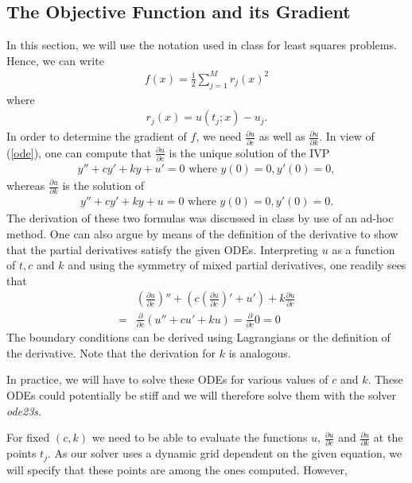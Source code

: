 \documentclass{article}
\begin{document}
\subsection{The Objective Function and its Gradient}
In this section, we will use the notation used in class for
least squares problems. Hence, we can write 
\begin{align*}
f(x)=\frac{1}{2}\sum_{j=1}^M r_j(x)^2
\end{align*}
where 
\begin{align*}
  r_j(x)= u(t_j;x)-u_j.
\end{align*}
In order to determine the gradient of $f$, we need $\frac{\partial u}{\partial c}$
as well as $\frac{\partial u}{\partial k}$. In view of (\ref{ode}), one can compute that
 $\frac{\partial u}{\partial c}$ is the unique  solution of the IVP 
\begin{align}
   y''+cy'+ky+u'=0 \textrm{ where } y(0)=0, y'(0)=0,
\label{odec}
\end{align}
whereas  $\frac{\partial u}{\partial k}$ is the solution of
\begin{align}
   y''+cy'+ky+u=0 \textrm{ where } y(0)=0, y'(0)=0.
\label{odek}
\end{align}
The derivation of these two formulas was discussed in class by use of an ad-hoc method. One can also argue by
means of the definition of the derivative to show that the partial derivatives satisfy the given ODEs. Interpreting $u$ as a function of $t,c$ and $k$ and
using the symmetry of mixed partial derivatives, one readily sees  that 
\begin{align*}
 &\left( \frac{\partial u}{\partial c}\right)''+\left(c \left(\frac{\partial u}{\partial c}\right)'+u' \right)+k \frac{\partial u}{\partial c} \\
= & \frac{\partial}{\partial c}\left(u''+cu'+ku  \right)=\frac{\partial}{\partial c} 0 =0
\end{align*}
 The boundary conditions can be derived using Lagrangians or the definition of the derivative. Note that the derivation for $k$ is analogous. \par
In practice, we will have to solve these ODEs for various values of $c$ and $k$. These ODEs could potentially be stiff and we will therefore solve them with the
solver \emph{ode23s}. \par
For fixed $(c,k)$ we need to be able to evaluate the functions
$u$, $\frac{\partial u}{\partial c}$ and $\frac{\partial u}{\partial k}$
at the points $t_j$. As our solver uses a dynamic grid dependent on the
given equation, we will specify that these points are among the ones computed. However,
\end{document}
